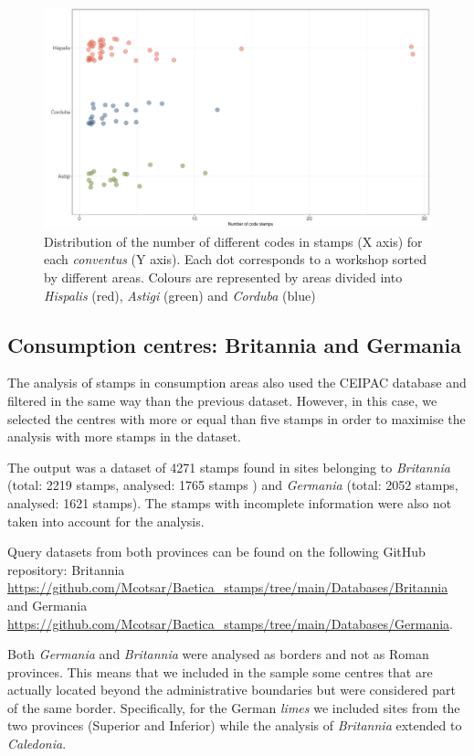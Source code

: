 \begin{figure}[htp]
	\centering
\includegraphics[width=\linewidth]{frequency}
\caption{Distribution of the number of different codes in stamps (X axis) for each \textit{conventus} (Y axis). Each dot corresponds to a workshop sorted by different areas. Colours are represented by areas divided into \textit{Hispalis} (red), \textit{Astigi} (green) and \textit{Corduba} (blue)}
\label{frequency}
\end{figure} 


\subsection{Consumption centres: Britannia and Germania}
\label{sec:5}

The analysis of stamps in consumption areas also used the CEIPAC database and filtered in the same way than the previous dataset. However, in this case, we selected the centres with more or equal than five stamps in order to maximise the analysis with more stamps in the dataset.   

The output was a dataset of 4271 stamps found in sites belonging to \textit{Britannia} (total: 2219 stamps, analysed: 1765 stamps ) and \textit{Germania} (total: 2052 stamps, analysed: 1621 stamps). The stamps with incomplete information were also not taken into account for the analysis. 

Query datasets from both provinces can be found on the following GitHub repository: Britannia~ \url{https://github.com/Mcotsar/Baetica_stamps/tree/main/Databases/Britannia} and Germania~ \url{https://github.com/Mcotsar/Baetica_stamps/tree/main/Databases/Germania}.

Both \textit{Germania} and \textit{Britannia} were analysed as borders and not as Roman provinces. This means that we included in the sample some centres that are actually located beyond the administrative boundaries but were considered part of the same border. Specifically, for the German \textit{limes} we included sites from the two provinces (Superior and Inferior) while the analysis of \textit{Britannia} extended to \textit{Caledonia}.
 
